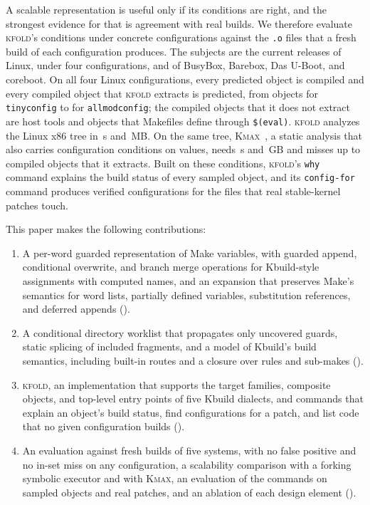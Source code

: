 \documentclass[acmsmall,screen,review]{acmart}
\newcommand{\tool}{\textsc{kfold}\xspace}
\newcommand{\kmax}{\textsc{Kmax}\xspace}
\begin{document}
A scalable representation is useful only if its conditions are right, and the strongest evidence for that is agreement with real builds. We therefore evaluate \tool's conditions under concrete configurations against the \texttt{.o} files that a fresh build of each configuration produces. The subjects are the current releases of Linux, under four configurations, and of BusyBox, Barebox, Das U-Boot, and coreboot. On all four Linux configurations, every predicted object is compiled and every compiled object that \tool extracts is predicted, from \NLinuxTinyconfigTp objects for \texttt{tinyconfig} to \NLinuxAllmodconfigTp for \texttt{allmodconfig}; the compiled objects that it does not extract are host tools and objects that Makefiles define through \texttt{\$(eval)}. \tool analyzes the Linux x86 tree in \NLinuxSeconds\,s and \NLinuxRss\,MB. On the same tree, \kmax~\cite{gazzillo2017kmax}, a static analysis that also carries configuration conditions on values, needs \NLinuxKmaxSeconds\,s and \NLinuxKmaxRssGb\,GB and misses up to \NLinuxKmaxAllmodconfigWithDirsFn compiled objects that it extracts. Built on these conditions, \tool's \texttt{why} command explains the build status of every sampled object, and its \texttt{config-for} command produces verified configurations for the files that real stable-kernel patches touch.

This paper makes the following contributions:
\begin{enumerate}
\item A per-word guarded representation of Make variables, with guarded append, conditional overwrite, and branch merge operations for Kbuild-style assignments with computed names, and an expansion that preserves Make's semantics for word lists, partially defined variables, substitution references, and deferred appends ().
\item A conditional directory worklist that propagates only uncovered guards, static splicing of included fragments, and a model of Kbuild's build semantics, including built-in routes and a closure over rules and sub-makes ().
\item \tool, an implementation that supports the target families, composite objects, and top-level entry points of five Kbuild dialects, and commands that explain an object's build status, find configurations for a patch, and list code that no given configuration builds ().
\item An evaluation against fresh builds of five systems, with no false positive and no in-set miss on any configuration, a scalability comparison with a forking symbolic executor and with \kmax, an evaluation of the commands on sampled objects and real patches, and an ablation of each design element ().
\end{enumerate}
\end{document}
